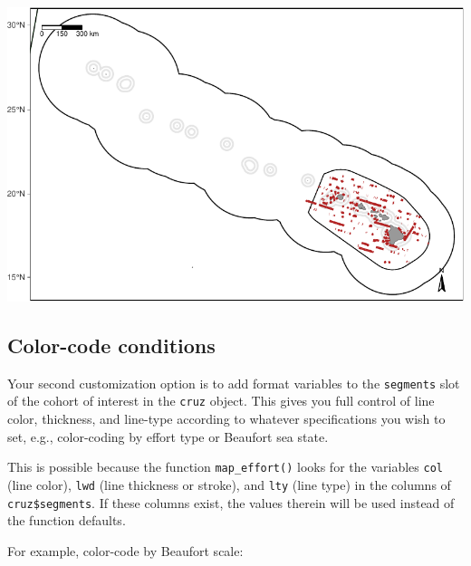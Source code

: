 \documentclass[
]{book}
\begin{document}
\includegraphics{figures/unnamed-chunk-48-1.pdf}

\hypertarget{color-code-conditions}{%
\subsection*{Color-code conditions}\label{color-code-conditions}}

Your second customization option is to add format variables to the \texttt{segments} slot of the cohort of interest in the \texttt{cruz} object. This gives you full control of line color, thickness, and line-type according to whatever specifications you wish to set, e.g., color-coding by effort type or Beaufort sea state.

This is possible because the function \texttt{map\_effort()} looks for the variables \texttt{col} (line color), \texttt{lwd} (line thickness or stroke), and \texttt{lty} (line type) in the columns of \texttt{cruz\$segments}. If these columns exist, the values therein will be used instead of the function defaults.

For example, color-code by Beaufort scale:
\end{document}
